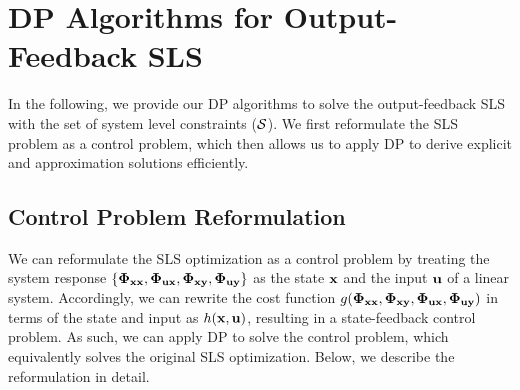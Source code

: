 \section{DP Algorithms for Output-Feedback SLS}\label{sec:DP_algorithm} %

In the following, we provide our DP algorithms to solve the output-feedback SLS  with the set of system level constraints ($\mathcal{S}$).
We first reformulate the SLS problem as a control problem, which then allows us to apply DP to derive explicit and approximation solutions efficiently. 


\iffalse
We will derive a dynamic program that solves \eqn{SLS_output_feedback}, resulting in an optimal stable control. 
First, we will reformulate the SLS problem as a control problem; then we will
show the exacty solution as well as an approximation to the algorithm which expedites the run time.
\fi

\subsection{Control Problem Reformulation}
We can reformulate the SLS optimization  as a control problem by treating the system response $\{\bm{\Phi}_{{\bf x}{\bf x}}, \bm{\Phi}_{{\bf u}{\bf x}}, \bm{\Phi}_{{\bf x}{\bf y}}, \bm{\Phi}_{{\bf u}{\bf y}}\}$ as the state ${\bf x}$ and the input ${\bf u}$ of a linear system.
Accordingly, we can rewrite the cost function $g(\bm{\Phi}_{{\bf x}{\bf x}},\bm{\Phi}_{{\bf x}{\bf y}},\bm{\Phi}_{{\bf u}{\bf x}},\bm{\Phi}_{{\bf u}{\bf y}})$ in terms of the state and input as $h({\bf x},{\bf u})$, resulting in a state-feedback control problem. As such, we can apply DP to solve the control problem, which equivalently solves the original SLS optimization. Below, we describe the reformulation in detail.

\iffalse
The cost function $g(\xx,\xy,\ux,\uy)$
can be rewritten in terms of the states and inputs, resulting in a state feedback optimization problem, which we can solve
using dymanic programming. \newline
\fi

